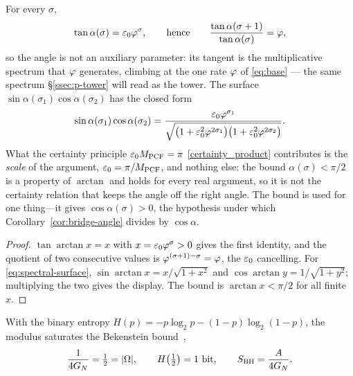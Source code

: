 \begin{proposition}\label{prop:spectral-angle-tower}
For every $\sigma$,
\begin{equation}\label{eq:spectral-angle}
  \tan\alpha(\sigma)=\varepsilon_{0}\varphi^{\sigma},
  \qquad\text{hence}\qquad
  \frac{\tan\alpha(\sigma+1)}{\tan\alpha(\sigma)}=\varphi ,
\end{equation}
so the angle is not an auxiliary parameter: its tangent is the multiplicative spectrum that
$\varphi$ generates, climbing at the one rate $\varphi$ of \eqref{eq:base} --- the same spectrum
\S\ref{ssec:p-tower} will read as the tower. The surface
$\sin\alpha(\sigma_1)\cos\alpha(\sigma_2)$ has the closed form
\begin{equation}\label{eq:spectral-surface}
  \sin\alpha(\sigma_1)\cos\alpha(\sigma_2)
  =\frac{\varepsilon_{0}\varphi^{\sigma_1}}
        {\sqrt{\bigl(1+\varepsilon_{0}^{2}\varphi^{2\sigma_1}\bigr)\bigl(1+\varepsilon_{0}^{2}\varphi^{2\sigma_2}\bigr)}} .
\end{equation}
What the certainty principle $\varepsilon_{0}M_{\mathrm{PCF}}=\pi$ \eqref{certainty_product} contributes is the
\emph{scale} of the argument, $\varepsilon_{0}=\pi/M_{\mathrm{PCF}}$, and nothing else: the bound
$\alpha(\sigma)<\pi/2$ is a property of $\arctan$ and holds for every real argument, so it is
not the certainty relation that keeps the angle off the right angle. The bound is used for one
thing---it gives $\cos\alpha(\sigma)>0$, the hypothesis under which
Corollary~\ref{cor:bridge-angle} divides by $\cos\alpha$.


\end{proposition}
\begin{proof}
$\tan\arctan x=x$ with $x=\varepsilon_{0}\varphi^{\sigma}>0$ gives the first identity, and the quotient of two
consecutive values is $\varphi^{(\sigma+1)-\sigma}=\varphi$, the $\varepsilon_{0}$ cancelling. For
\eqref{eq:spectral-surface}, $\sin\arctan x=x/\sqrt{1+x^{2}}$ and $\cos\arctan y=1/\sqrt{1+y^{2}}$;
multiplying the two gives the display. The bound is $\arctan x<\pi/2$ for all finite $x$.
\end{proof}
With the binary entropy $H(p)=-p\log_{2}p-(1-p)\log_{2}(1-p)$, the modulus saturates the
Bekenstein bound~\cite{Bekenstein73,Hawking75},
\begin{equation}\label{eq:bridge-BH}
  \frac{1}{4\GN}=\tfrac12=|\Om|,\qquad H\!\left(\tfrac12\right)=1\ \text{bit},\qquad
  \SBH=\frac{A}{4\GN}.
\end{equation}

